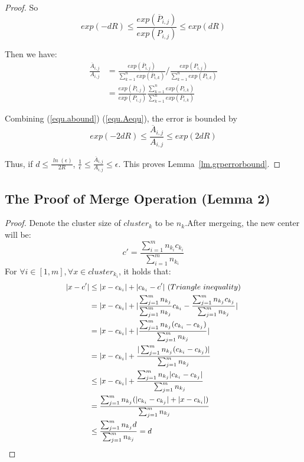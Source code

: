 \begin{sloppypar}
\begin{proof}
So
\begin{equation}
\label{equ.abound}
exp(-dR) \leq \frac{exp(\overline{P}_{i,j})}{exp(P_{i,j})} \leq exp(dR)
\end{equation}

Then we have:
\begin{equation}
\label{equ.Aequ}
\begin{aligned}
\frac{\overline{A}_{i,j}}{A_{i,j}}&=\frac{exp(\overline{P}_{i,j})}{\sum_{k=1}^{n} exp(\overline{P}_{i,k})} / \frac{exp({P}_{i,j})}{\sum_{k=1}^{n} exp({P}_{i,k})}\\
&=\frac{exp(\overline{P}_{i,j})}{exp({P}_{i,j})} \frac{\sum_{k=1}^{n} exp({P}_{i,k})}{\sum_{k=1}^{n} exp(\overline{P}_{i,k})}
\end{aligned}
\end{equation}

Combining (\ref{equ.abound}) (\ref{equ.Aequ}), the error is bounded by
\begin{equation}
\label{equ.Abound}
exp(-2dR) \leq \frac{\overline{A}_{i,j}}{A_{i,j}} \leq exp(2dR)
\end{equation}

Thus, if $\mathit{d \leq \frac{\ln(\epsilon)}{2R}}$, $\mathit{\frac{1}{\epsilon} \leq \frac{\overline{A}_{i,j}}{A_{i,j}} \leq \epsilon}$. This proves Lemma~\ref{lm.grperrorbound}.
\end{proof}



\subsection{The Proof of Merge Operation (Lemma 2)}
\label{appendix.proof.merge}
\begin{proof}
\renewcommand{\qedsymbol}{}
Denote the cluster size of $cluster_k$ to be $n_k$.After mergeing, the new center will be: $$c'= \frac{\sum_{i=1}^m n_{k_i}c_{k_i}}{\sum_{i=1}^m n_{k_i}}$$
For $\forall i \in [1,m],\forall x \in cluster_{k_i}$, it holds that:
\begin{equation}
\small
\label{eq.tri}
\begin{aligned}
        |x-c'| &\leq |x-c_{k_i}|+|c_{k_i}-c'|\  (Triangle\  inequality)\\
        &=|x-c_{k_i}|+| \frac{\sum_{j=1}^m n_{k_j}}{\sum_{j=1}^m n_{k_j}}c_{k_i}-
        \frac{\sum_{j=1}^m n_{k_j}c_{k_j}}{\sum_{j=1}^m n_{k_j}}|\\
        &=|x-c_{k_i}|+| 
         \frac{\sum_{j=1}^m n_{k_j}(c_{k_i}-c_{k_j})}{\sum_{j=1}^m n_{k_j}}|\\
        &=|x-c_{k_i}|+\frac{|\sum_{j=1}^m n_{k_j}(c_{k_i}-c_{k_j})|}{\sum_{j=1}^m n_{k_j}}\\
        &\leq |x-c_{k_i}|+\frac{\sum_{j=1}^m n_{k_j}|c_{k_i}-c_{k_j}|}{\sum_{j=1}^m n_{k_j}}\\
        &= \frac{\sum_{j=1}^m n_{k_j}(|c_{k_i}-c_{k_j}|+|x-c_{k_i}|)}{\sum_{j=1}^m n_{k_j}}\\
        &\leq \frac{\sum_{j=1}^m n_{k_j}d}{\sum_{j=1}^m n_{k_j}} =d
\end{aligned}
\end{equation}
\end{proof}


\end{sloppypar}
